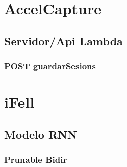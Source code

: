 \section{AccelCapture}
\subsection{Servidor/Api Lambda}\label{app:code:accelcapturelambda} 
\subsubsection{POST guardarSesions}


\section{iFell}
\subsection{Modelo RNN}
\subsubsection{Prunable Bidir}\label{app:code:ifell:prunebidir}

